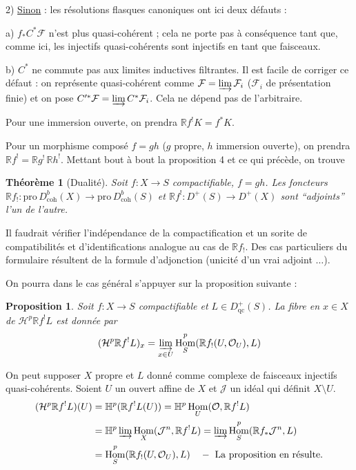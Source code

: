 \documentclass[12pt]{amsart}
\theoremstyle{plain}
\newtheorem{prop}{Proposition}
\newtheorem{thm}{Théorème}
\theoremstyle{definition}
\DeclareMathOperator{\Hom}{Hom}
\newcommand{\Pro}{\text{pro}\,}
\newcommand{\coh}{\text{coh}}
\newcommand{\cF}{\mathcal{F}}
\newcommand{\cH}{\mathcal{H}}
\newcommand{\cJ}{\mathcal{J}}
\newcommand{\cO}{\mathcal{O}}
\newcommand{\cDb}{D^{b}}
\newcommand{\cD}{D}
\newcommand{\bH}{\mathbb{H}}
\newcommand{\bR}{\mathbb{R}}
\begin{document}
2) \underline{Sinon} : les r\'esolutions flasques canoniques ont ici deux d\'efauts :

a) $f_{*}C^{*}\cF$ n'est plus quasi-coh\'erent ; cela ne porte pas \`a cons\'equence tant que, comme ici, les injectifs quasi-coh\'erents sont injectifs en tant que faisceaux.

b) $C^{*}$ ne commute pas aux limites inductives filtrantes. Il est facile de corriger ce d\'efaut : on repr\'esente quasi-coh\'erent comme $\cF = \varinjlim \cF_{i}$ ($\cF_{i}$ de pr\'esentation finie) et on pose $C'^{*}\cF = \varinjlim C^{*}\cF_{i}$. Cela ne d\'epend pas de l'arbitraire.

Pour une immersion ouverte, on prendra $\bR f^{!}K = f^{*}K$.

Pour un morphisme compos\'e $f = gh$ ($g$ propre, $h$ immersion ouverte), on prendra $\bR f^{!} = \bR g^{!}\,\bR h^{!}$. Mettant bout \`a bout la proposition 4 et ce qui pr\'ec\`ede, on trouve

\begin{thm}[Dualit\'e]
Soit $f: X \to S$ compactifiable, $f = gh$. Les foncteurs $\bR f_{!}: \Pro\cDb_{\coh}(X) \to \Pro\cDb_{\coh}(S)$ et $\bR f^{!}: \cD^{+}(S) \to \cD^{+}(X)$ sont ``adjoints'' l'un de l'autre.
\end{thm}

Il faudrait v\'erifier l'ind\'ependance de la compactification et un sorite de compatibilit\'es et d'identifications analogue au cas de $\bR f_{!}$. Des cas particuliers du formulaire r\'esultent de la formule d'adjonction (unicit\'e d'un vrai adjoint $\ldots$).

On pourra dans le cas g\'en\'eral s'appuyer sur la proposition suivante :

\begin{prop}
Soit $f: X \to S$ compactifiable et $L \in \cD^{+}_{\text{qc}}(S)$. La fibre en $x \in X$ de $\cH^{p}\bR f^{!}L$ est donn\'ee par
\[
(\cH^{p}\bR f^{!}L)_{x} = \varinjlim_{x \in U} \Hom^{p}_{S}(\bR f_{!}(U,\cO_{U}), L)
\]
\end{prop}

On peut supposer $X$ propre et $L$ donn\'e comme complexe de faisceaux injectifs quasi-coh\'erents. Soient $U$ un ouvert affine de $X$ et $\cJ$ un id\'eal qui d\'efinit $X \setminus U$.
\begin{align*}
(\cH^{p}\bR f^{!}L)(U) &= \bH^{p}(\bR f^{!}L(U)) = \bH^{p}\Hom_{U}(\cO, \bR f^{!}L) \\
&= \bH^{p}\varinjlim \Hom_{X}(\cJ^{n}, \bR f^{!}L) = \varinjlim \Hom^{p}_{S}(\bR f_{*}\cJ^{n}, L) \\
&= \Hom^{p}_{S}(\bR f_{!}(U,\cO_{U}), L) \quad - \text{ La proposition en r\'esulte.}
\end{align*}
\end{document}
